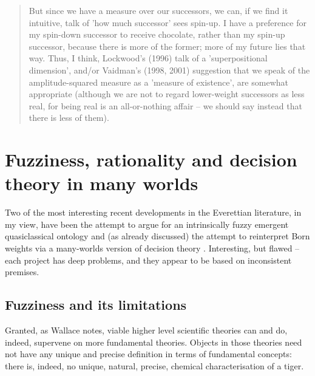 \documentclass[aps,
pra,epsfig,12pt,nofootinbib]{revtex4}
\begin{document}
\begin{quotation} 
But since we have
a measure over our successors, we can, if we find it intuitive, talk of 'how
much successor' sees spin-up. I have a preference for my spin-down successor
to receive chocolate, rather than my spin-up successor, because there is more of
the former; more of my future lies that way. Thus, I think, Lockwood's (1996)
talk of a 'superpositional dimension', and/or Vaidman's (1998, 2001) suggestion
that we speak of the amplitude-squared measure as a 'measure of existence', are
somewhat appropriate (although we are not to regard lower-weight successors
as less real, for being real is an 
all-or-nothing affair -- we should say instead
that there is less of them).
\end{quotation}

\section{Fuzziness, rationality and decision theory in many worlds}

Two of the most interesting recent developments in the Everettian
literature, in my view, have been the attempt to argue for
an intrinsically fuzzy emergent quasiclassical ontology \cite{wallacevolone}
and (as already discussed) the attempt to reinterpret
Born weights via a many-worlds version of 
decision theory \cite{wallacevoltwo}.   
Interesting, but flawed -- 
each project has deep problems, and they appear to be based on
inconsistent premises.   

\subsection{Fuzziness and its limitations}

Granted, as Wallace \cite{wallacevolone} notes, viable higher level scientific 
theories can and do, indeed, supervene on more fundamental theories. 
Objects in those theories need not have any unique and
precise definition in terms of fundamental concepts: 
there is, indeed, no unique, natural, precise, chemical characterisation 
of a tiger. 
\end{document}
